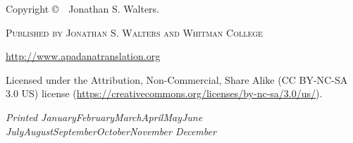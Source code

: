 \newcommand{\monthyear}{%
  \ifcase\month\or January\or February\or March\or April\or May\or June\or
  July\or August\or September\or October\or November\or
  December\fi\space\number\year
}

\newpage
\thispagestyle{empty}

\begin{flushleft}

\vspace*{\fill}

Copyright \copyright\ \the\year\ Jonathan S. Walters.

\par\textsc{Published by Jonathan S. Walters and Whitman College}

\par\url{http://www.apadanatranslation.org}

\par Licensed under the Attribution, Non-Commercial, Share Alike (\textsc{CC BY-NC-SA 3.0 US}) license (\url{https://creativecommons.org/licenses/by-nc-sa/3.0/us/}).

\par\textit{Printed \monthyear}

\end{flushleft}

\newpage
